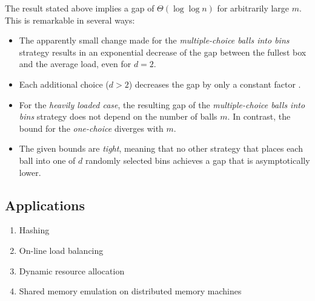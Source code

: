 \documentclass{acm_proc_article-sp}
\begin{document}
The result stated above implies a gap of $\Theta\left(\log \log n \right)$ for arbitrarily large $m$. This is remarkable in several ways:
\begin{itemize}
\item The apparently small change made for the \emph{multiple-choice balls into bins} strategy results in an exponential decrease of the gap between the fullest box and the average load, even for $d=2$. 
\item Each additional choice ($d > 2$) decreases the gap by only a constant factor \cite{RMS01}. 
\item For the \emph{heavily loaded case}, the resulting gap of the \emph{multiple-choice balls into bins} strategy does not depend on the number of balls $m$. In contrast, the bound for the \emph{one-choice} diverges with $m$.
\item The given bounds are \emph{tight}, meaning that no other strategy that places each ball into one of $d$ randomly selected bins achieves a gap that is asymptotically lower.
\end{itemize}

\subsection{Applications}
\label{sec:applications}
\begin{enumerate}
\item Hashing
\item On-line load balancing
\item Dynamic resource allocation
\item Shared memory emulation on distributed memory machines
\end{enumerate}



 
\end{document}
